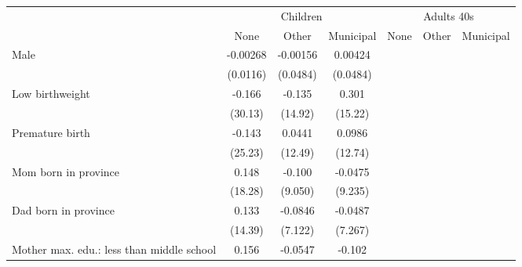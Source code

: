 {
\def\sym#1{\ifmmode^{#1}\else\(^{#1}\)\fi}
\begin{tabular}{l*{6}{c}}
\toprule
& \multicolumn{3}{c}{Children} &  \multicolumn{3}{c}{Adults 40s} \\
                    &\multicolumn{1}{c}{None}&\multicolumn{1}{c}{Other}&\multicolumn{1}{c}{Municipal}&\multicolumn{1}{c}{None}&\multicolumn{1}{c}{Other}&\multicolumn{1}{c}{Municipal}\\
\midrule
Male                &    -0.00268         &    -0.00156         &     0.00424         &                     &                     &                     \\
                    &    (0.0116)         &    (0.0484)         &    (0.0484)         &                     &                     &                     \\
\addlinespace
Low birthweight     &      -0.166         &      -0.135         &       0.301         &                     &                     &                     \\
                    &     (30.13)         &     (14.92)         &     (15.22)         &                     &                     &                     \\
\addlinespace
Premature birth     &      -0.143         &      0.0441         &      0.0986         &                     &                     &                     \\
                    &     (25.23)         &     (12.49)         &     (12.74)         &                     &                     &                     \\
\addlinespace
Mom born in province&       0.148         &      -0.100         &     -0.0475         &                     &                     &                     \\
                    &     (18.28)         &     (9.050)         &     (9.235)         &                     &                     &                     \\
\addlinespace
Dad born in province&       0.133         &     -0.0846         &     -0.0487         &                     &                     &                     \\
                    &     (14.39)         &     (7.122)         &     (7.267)         &                     &                     &                     \\
\addlinespace
Mother max. edu.: less than middle school&       0.156         &     -0.0547         &      -0.102         &                     &                     &                     \\

\end{tabular}}
